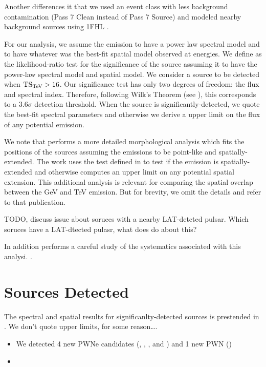Another differences it that we used an event class with less background
contamination (Pass 7 Clean instead of Pass 7 Source) and modeled
nearby background sources using \ac{1FHL} \cite{ackermann_2013a_first-fermi-lat}.

For our analysis, we assume the \gev emission to have a power law spectral
model and to have whatever was the best-fit spatial model observed at
\tev energies.  We define \tstev as the likelihood-ratio test for the
significance of the source assuming it to have the power-law spectral
model and \tev spatial model.  We consider a source to be detected when
$\mathrm{TS}_\text{TeV} > 16$.  Our significance test has only two degrees of freedom:
the flux and spectral index.  Therefore, following Wilk's Theorem (see
), this corresponds to a $3.6\sigma$
detection threshold. When the source is significantly-detected, we quote
the best-fit spectral parameters and otherwise we derive a upper limit
on the flux of any potential emission.

We note that \cite{acero_2013a_constraints-galactic} performs a more
detailed morphological analysis which fits the positions of the sources
assuming the emissions to be point-like and spatially-extended.  The work
uses the \tsext test defined in  to test if
the emission is spatially-extended and otherwise computes an upper limit
on any potential spatial extension.  This additional analysis is relevant
for comparing the spatial overlap between the GeV and TeV emission. But
for brevity, we omit the details and refer to that publication.

TODO, discuss issue about soruces with a nearby LAT-detcted pulsar.
Which soruces have a LAT-dtected pulasr, what does 
\cite{acero_2013a_constraints-galactic} do about this?

In addition \cite{acero_2013a_constraints-galactic} performs
a careful study of the systematics associated with this analysi.
.

\section{Sources Detected}

The spectral and spatial results for significanlty-detected sources is prestended in
. We don't quote upper limits, for some reason\ldots.




\begin{itemize}
  \item
    We detected 4 new PWNe candidates (, ,
    ,
    and )
    and 1 new PWN ()
  \item
\end{itemize}
